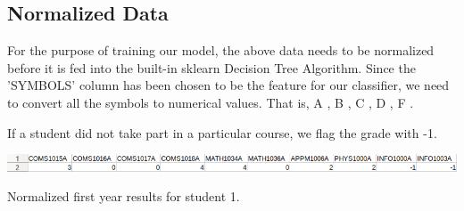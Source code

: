 \documentclass[10pt]{article}
\begin{document}
\subsection{Normalized Data}

For the purpose of training our model, the above data needs to be normalized before it is fed into the built-in sklearn Decision Tree Algorithm. Since the 'SYMBOLS' column has been chosen to be the feature for our classifier, we need to convert all the symbols to numerical values. That is, A  , B  , C , D , F .

If a student did not take part in a particular course, we flag the grade with -1.

\begin{center}
\includegraphics[width=1.0\textwidth]{normalized_features.png}
\end{center}
\caption{Normalized first year results for student 1.}  
\end{document}
